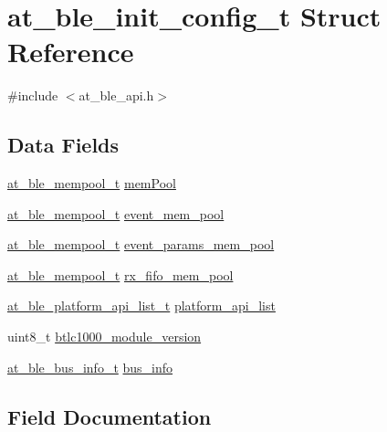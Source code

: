 \hypertarget{structat__ble__init__config__t}{}\section{at\+\_\+ble\+\_\+init\+\_\+config\+\_\+t Struct Reference}
\label{structat__ble__init__config__t}


{\ttfamily \#include $<$at\+\_\+ble\+\_\+api.\+h$>$}

\subsection*{Data Fields}
\begin{DoxyCompactItemize}
\item 
\mbox{\hyperlink{structat__ble__mempool__t}{at\+\_\+ble\+\_\+mempool\+\_\+t}} \mbox{\hyperlink{structat__ble__init__config__t_a107945f763d61e260b5e81af7c0fef42}{mem\+Pool}}
\item 
\mbox{\hyperlink{structat__ble__mempool__t}{at\+\_\+ble\+\_\+mempool\+\_\+t}} \mbox{\hyperlink{structat__ble__init__config__t_aec15314f2b1e4cca55e174d971e598b8}{event\+\_\+mem\+\_\+pool}}
\item 
\mbox{\hyperlink{structat__ble__mempool__t}{at\+\_\+ble\+\_\+mempool\+\_\+t}} \mbox{\hyperlink{structat__ble__init__config__t_a57e24de212ef8152213f6f74509efd66}{event\+\_\+params\+\_\+mem\+\_\+pool}}
\item 
\mbox{\hyperlink{structat__ble__mempool__t}{at\+\_\+ble\+\_\+mempool\+\_\+t}} \mbox{\hyperlink{structat__ble__init__config__t_a010b3c9a7ee5ed3f204e2c0e35be5c0a}{rx\+\_\+fifo\+\_\+mem\+\_\+pool}}
\item 
\mbox{\hyperlink{at__ble__api_8h_a8cb09712407255776fc9e2917a4b10c8}{at\+\_\+ble\+\_\+platform\+\_\+api\+\_\+list\+\_\+t}} \mbox{\hyperlink{structat__ble__init__config__t_a87f8bbe544ee7aa0848f7af1cf2bee69}{platform\+\_\+api\+\_\+list}}
\item 
uint8\+\_\+t \mbox{\hyperlink{structat__ble__init__config__t_ad2e7366d9be338e0ea93dcc7ac7c6915}{btlc1000\+\_\+module\+\_\+version}}
\item 
\mbox{\hyperlink{structat__ble__bus__info__t}{at\+\_\+ble\+\_\+bus\+\_\+info\+\_\+t}} \mbox{\hyperlink{structat__ble__init__config__t_acbd8e2d1e28485d88e8026f3892fa8b8}{bus\+\_\+info}}
\end{DoxyCompactItemize}


\subsection{Field Documentation}
\mbox{\label{structat__ble__init__config__t_ad2e7366d9be338e0ea93dcc7ac7c6915}} 
